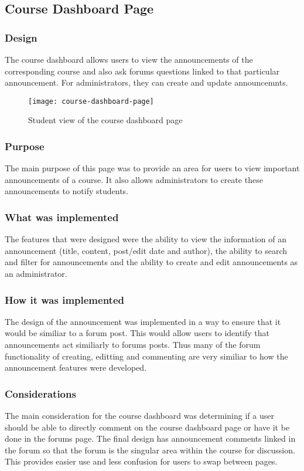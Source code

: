 \subsection{Course Dashboard Page}
\subsubsection{Design}
The course dashboard allows users to view the announcements of the corresponding course and also ask forums questions linked to that particular announcement. For administrators, they can create and update announcemnts.
\begin{figure}[h!]
    \centering
    \texttt{[image: course-dashboard-page]}
    \caption{Student view of the course dashboard page}
\end{figure}

\subsubsection{Purpose}
The main purpose of this page was to provide an area for users to view important announcements of a course.
It also allows administrators to create these announcements to notify students.
\subsubsection{What was implemented}
The features that were designed were the ability to view the information of an announcement (title, content, post/edit date and author), the ability to search and filter for announcements and the ability to create and edit announcements as an administrator.
\subsubsection{How it was implemented}
The design of the announcement was implemented in a way to ensure that it would be similiar to a forum post. This would allow users to identify that announcements act similiarly to forums posts.
Thus many of the forum functionality of creating, editting and commenting are very similiar to how the announcement features were developed.
\subsubsection{Considerations}
The main consideration for the course dashboard was determining if a user should be able to directly comment on the course dashboard page or have it be done in the forums page.
The final design has announcement comments linked in the forum so that the forum is the singular area within the course for discussion.
This provides easier use and less confusion for users to swap between pages.

